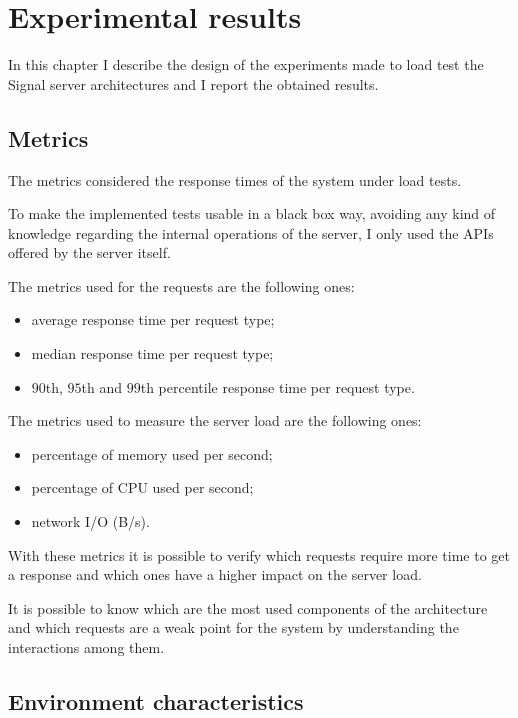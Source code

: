 \chapter{Experimental results\label{sec:experimentalresults}}

In this chapter I describe the design of the experiments made to load test the Signal server architectures and I report the obtained results.

\section{Metrics\label{sec:metrics}}

The metrics considered the response times of the system under load tests.

To make the implemented tests usable in a black box way, avoiding any kind of knowledge regarding the internal operations of the server, I only used the APIs offered by the server itself.

The metrics used for the requests are the following ones:
\begin{itemize}
    \item average response time per request type;
    \item median response time per request type;
    \item $90$th, $95$th and $99$th percentile response time per request type.
\end{itemize}

The metrics used to measure the server load are the following ones:
\begin{itemize}
    \item percentage of memory used per second;
    \item percentage of CPU used per second;
    \item network I/O (B/s).
\end{itemize}

With these metrics it is possible to verify which requests require more time to get a response and which ones have a higher impact on the server load.

It is possible to know which are the most used components of the architecture and which requests are a weak point for the system by understanding the interactions among them.

\section{Environment characteristics\label{sec:environment}}

